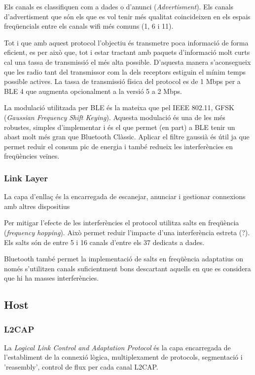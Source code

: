 Els canals es classifiquen com a dades o d'anunci (\textit{Advertisment}). Els canals d'advertisment que són els que es vol tenir més qualitat coincideixen en els espais freqüencials entre els canals wifi més comuns (1, 6 i 11).

Tot i que amb aquest protocol l'objectiu és transmetre poca informació de forma eficient, es per això que, tot i estar tractant amb paquets d'informació molt curts cal una tassa de transmissió el més alta possible. D'aquesta manera s'aconsegueix que les radio tant del transmissor com la dels receptors estiguin el mínim temps possible actives.
La tassa de transmissió física del protocol es de 1 Mbps per a BLE 4 que augmenta opcionalment a la versió 5 a 2 Mbps.

La modulació utilitzada per BLE és la mateixa que pel IEEE 802.11, GFSK (\textit{Gaussian Frequency Shift Keying}). Aquesta modulació és una de les més robustes, simples d'implementar i és el que permet (en part) a BLE tenir un abast molt més gran que Bluetooth Clàssic. Aplicar el filtre gaussià és útil ja que permet reduir el consum pic de energia \cite{BLE_Review} i també redueix les interferències en freqüències veïnes.


\subsubsection{Link Layer}

La capa d'enllaç és la encarregada de escanejar, anunciar i gestionar connexions amb altres dispositius

Per mitigar l'efecte de les interferències el protocol utilitza salts en freqüència (\textit{frequency hopping}). Això permet reduir l'impacte d'una interferència estreta (?). Els salts són de entre 5 i 16 canals d'entre els 37 dedicats a dades.

Bluetooth també permet la implementació de salts en freqüència adaptatius on només s'utilitzen canals suficientment bons descartant aquells en que es considera que hi ha masses interferències.

\subsection{Host}
\subsubsection{L2CAP}
La \textit{Logical Link Control and Adaptation Protocol} és la capa encarregada de l'establiment de la connexió lògica, multiplexament de protocols, segmentació i 'reasembly', control de flux per cada canal L2CAP.

